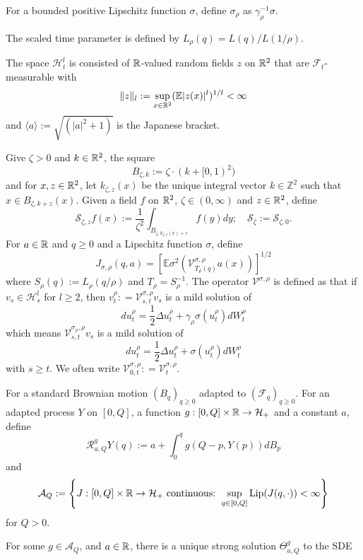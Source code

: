 \begin{definition}
    For a bounded positive Lipschitz function $\sigma$, define $\sigma_{\rho}$ as $\gamma_{\rho}^{-1}\sigma$.\par The scaled time parameter is defined by $L_{\rho}( q ) = L(q)/L(1/\rho)$.\par
    The space $\mathscr{H}_t^l$ is consisted of $\mathbb{R}$-valued random fields $z$ on $\mathbb{R}^2$ that are $\mathcal{F}_t$-measurable with
    \[
    \lVert z\rVert_l := \sup_{x\in\mathbb{R}^2}(\mathbb{E}\lvert z(x)\rvert^l)^{1/l} < \infty
    \]
    and $\langle a\rangle:= \sqrt{(|a|^2+1)}$ is the Japanese bracket.\par
    Give $\zeta > 0$ and $k\in\mathbb{R}^2$, the square
    \[
    B_{\zeta,k} := \zeta\cdot(k+[0,1)^2)
    \]
    and for $x,z\in\mathbb{R}^2$, let $k_{\zeta,z}(x)$ be the unique integral vector $k\in \mathbb{Z}^2$ such that $x\in B_{\zeta,k+z}(x)$. Given a field $f$ on $\mathbb{R}^2$, $\zeta \in (0,\infty)$ and $z\in \mathbb{R}^2$, define
    \[
    \mathcal{S}_{\zeta,z}f(x) := \dfrac{1}{\zeta^2} \int_{B_{\zeta,k_{\zeta,z}(x)+z}} f(y)dy;\quad \mathcal{S}_{\zeta}:= \mathcal{S}_{\zeta,0}.
    \]
    For $a\in\mathbb{R}$ and $q\geq 0$ and a Lipschitz function $\sigma$, define
    \[
        J_{\sigma,\rho}(q,a) = \left[\mathbb{E}\sigma^2\left(\mathcal{V}^{\sigma,\rho}_{T_{\rho}(q)}a(x)\right)\right]^{1/2}
    \]
    where $S_{\rho}(q) := L_{\rho}(q/\rho)$ and $T_{\rho} = S_{\rho}^{-1}$. The operator $\mathcal{V}^{\sigma,\rho}$ is defined as that if $v_s \in \mathscr{H}_s^l$ for $l\geq 2$, then $v_t^{\rho} : = \mathcal{V}^{\sigma,\rho}_{s,t} v_s$ is a mild solution of
    \[
    du_t^{\rho} = \dfrac{1}{2}\Delta u_t^{\rho} + \gamma_{\rho}\sigma(u_t^{\rho})dW_t^{\rho}
    \]
    which means $\mathcal{V}^{\sigma_{\rho},\rho}_{s,t}v_{s}$ is a mild solution of
    \[
    du_t^{\rho} = \dfrac{1}{2}\Delta u_t^{\rho} + \sigma(u_t^{\rho})dW_t^{\rho}
    \]
    with $s \geq t$. We often write $\mathcal{V}^{\sigma,\rho}_{0,t} :  = \mathcal{V}^{\sigma,\rho}_{t}$.\par
    For a standard Brownian motion $(B_q)_{q\geq 0}$ adapted to $(\mathcal{F}_{q})_{q\geq 0}$. For an adapted process $Y$ on $[0,Q]$, a function $g:[0,Q]\times \mathbb{R} \to \mathcal{H}_+$ and a constant $a$, define
    \[
    \mathcal{R}_{a,Q}^g Y(q):= a + \int_0^q g(Q-p,Y(p)) dB_p
    \]
    and
    \[
    \mathcal{A}_Q := \left\{J:[0,Q]\times\mathbb{R} \to \mathcal{H}_+\text{ continuous: }\sup_{q\in[0,Q]}\text{Lip}(J(q,\cdot)) < \infty \right\}
    \]
    for $Q > 0$.\par
    For some $g \in \mathcal{A}_Q$, and $a\in \mathbb{R}$, there is a unique strong solution $\Theta_{a,Q}^g$ to the SDE

\end{definition}

